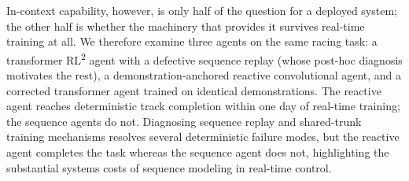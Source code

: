 \documentclass[conference]{IEEEtran}
\newcommand{\rltwo}{\texorpdfstring{RL\textsuperscript{2}}{RL2}}
\begin{document}
In-context capability, however, is only half of the question for a deployed system; the other half is whether the machinery that provides it survives real-time training at all. We therefore examine three agents on the same racing task: a transformer \rltwo{} agent with a defective sequence replay (whose post-hoc diagnosis motivates the rest), a demonstration-anchored reactive convolutional agent, and a corrected transformer agent trained on identical demonstrations. The reactive agent reaches deterministic track completion within one day of real-time training; the sequence agents do not. Diagnosing sequence replay and shared-trunk training mechanisms resolves several deterministic failure modes, but the reactive agent completes the task whereas the sequence agent does not, highlighting the substantial systems costs of sequence modeling in real-time control.
\end{document}

